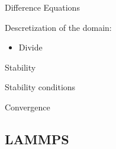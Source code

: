 \documentclass{beamer}
\theoremstyle{remark}
\begin{document}
\begin{frame}{Difference Equations}
	
	Descretization of the domain:
	\begin{itemize}
		\item Divide
	\end{itemize}

\end{frame}

\begin{frame}{Stability}

	Stability conditions
	
\end{frame}

\begin{frame}{Convergence}
	
\end{frame}

\subsection{LAMMPS}
\end{document}
